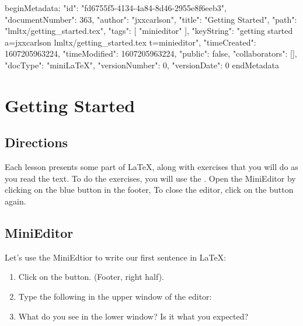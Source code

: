 beginMetadata:
{
    "id": "fd6755f5-4134-4a84-8d46-2955e8f6eeb3",
    "documentNumber": 363,
    "author": "jxxcarlson",
    "title": "Getting Started",
    "path": "lmltx/getting_started.tex",
    "tags": [
        "minieditor"
    ],
    "keyString": "getting started a=jxxcarlson lmltx/getting_started.tex t=minieditor",
    "timeCreated": 1607205963224,
    "timeModified": 1607205963224,
    "public": false,
    "collaborators": [],
    "docType": "miniLaTeX",
    "versionNumber": 0,
    "versionDate": 0
}
endMetadata

\section{Getting Started}

\innertableofcontents



\subsection{Directions}

Each lesson presents some part of LaTeX, along with exercises that you will do as you read the text.  To do the exercises, you will use the .  Open the MiniEditor by clicking on the blue  button in the footer,  To close the editor, click on the button again.  

\subsection{MiniEditor}

Let's use the MiniEdtior to write our first sentence in LaTeX:

\begin{enumerate}

\item Click on the  button. (Footer, right half).

\item Type the following in the upper window of the editor: 

\item What do you see in the lower window?   Is it what you expected?

\end{enumerate}


